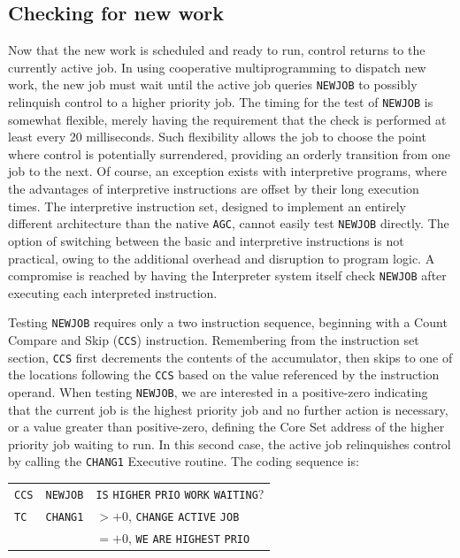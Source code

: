 \documentclass[refcap, oxford]{ahsan}
\begin{document}
\subsection{Checking for new work}
Now that the new work is scheduled and ready to run, control returns to the currently active job. In using cooperative multiprogramming to dispatch new work, the new job must wait until the active job queries \texttt{NEWJOB} to possibly relinquish control to a higher priority job. The timing for the test of \texttt{NEWJOB} is somewhat flexible, merely having the requirement that the check is performed at least every 20 milliseconds. Such flexibility allows the job to choose the point where control is potentially surrendered, providing an orderly transition from one job to the next. Of course, an exception exists with interpretive programs, where the advantages of interpretive instructions are offset by their long execution times. The interpretive instruction set, designed to implement an entirely different architecture than the native \texttt{AGC}, cannot easily test \texttt{NEWJOB} directly. The option of switching between the basic and interpretive instructions is not practical, owing to the additional overhead and disruption to program logic. A compromise is reached by having the Interpreter system itself check \texttt{NEWJOB} after executing each interpreted instruction.

Testing \texttt{NEWJOB} requires only a two instruction sequence, beginning with a Count Compare and Skip (\texttt{CCS}) instruction. Remembering from the instruction set section, \texttt{CCS} first decrements the contents of the accumulator, then skips to one of the locations following the \texttt{CCS} based on the value referenced by the instruction operand. When testing \texttt{NEWJOB}, we are interested in a positive-zero indicating that the current job is the highest priority job and no further action is necessary, or a value greater than positive-zero, defining the Core Set address of the higher priority job waiting to run. In this second case, the active job relinquishes control by calling the \texttt{CHANG1} Executive routine. The coding sequence is:

\begin{center}
\begin{tabular}{lll}
\texttt{CCS} & \texttt{NEWJOB} & \texttt{IS} \texttt{HIGHER} \texttt{PRIO} \texttt{WORK} \texttt{WAITING}? \\
\texttt{TC} & \texttt{CHANG1} & $>+0$, \texttt{CHANGE} \texttt{ACTIVE} \texttt{JOB} \\
 &  & $=+0$, \texttt{WE} \texttt{ARE} \texttt{HIGHEST} \texttt{PRIO} \\
\end{tabular}
\end{center}
\end{document}

